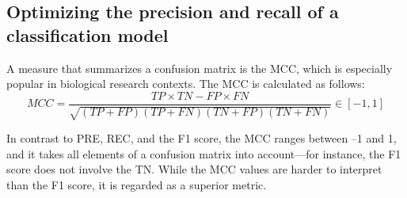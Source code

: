 \subsection{Optimizing the precision and recall of a classification model}
A measure that summarizes a confusion matrix is the MCC, which is especially popular in biological research contexts. The MCC is calculated as follows:
$$MCC=\frac{TP\times TN-FP\times FN}{\sqrt{(TP+FP)(TP+FN)(TN+FP)(TN+FN)}}\in [-1, 1]$$

In contrast to PRE, REC, and the F1 score, the MCC ranges between –1 and 1, and it takes all elements of a confusion matrix into account—for instance, the F1 score does not involve the TN. While the MCC values are harder to interpret than the F1 score, it is regarded as a superior metric.